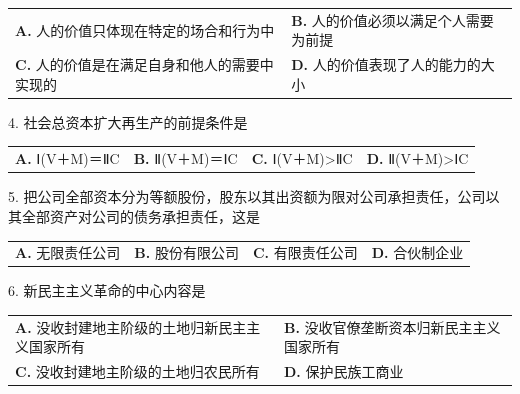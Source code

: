 \documentclass[UTF8,11pt]{ctexart}
\begin{document}
\begin{center}\begin{tabular}{>{\raggedright\arraybackslash}p{\dimexpr(\linewidth-4\tabcolsep)/2\relax}>{\raggedright\arraybackslash}p{\dimexpr(\linewidth-4\tabcolsep)/2\relax}}
\textbf{A.} 人的价值只体现在特定的场合和行为中 & \textbf{B.} 人的价值必须以满足个人需要为前提\\[.35em]
\textbf{C.} 人的价值是在满足自身和他人的需要中实现的 & \textbf{D.} 人的价值表现了人的能力的大小\\[.35em]\end{tabular}\end{center}

4. 社会总资本扩大再生产的前提条件是


\begin{center}\begin{tabular}{>{\raggedright\arraybackslash}p{\dimexpr(\linewidth-8\tabcolsep)/4\relax}>{\raggedright\arraybackslash}p{\dimexpr(\linewidth-8\tabcolsep)/4\relax}>{\raggedright\arraybackslash}p{\dimexpr(\linewidth-8\tabcolsep)/4\relax}>{\raggedright\arraybackslash}p{\dimexpr(\linewidth-8\tabcolsep)/4\relax}}
\textbf{A.} Ⅰ(V＋M)＝ⅡC & \textbf{B.} Ⅱ(V＋M)＝ⅠC & \textbf{C.} Ⅰ(V＋M)>ⅡC & \textbf{D.} Ⅱ(V＋M)>ⅠC\\[.35em]\end{tabular}\end{center}

5. 把公司全部资本分为等额股份，股东以其出资额为限对公司承担责任，公司以其全部资产对公司的债务承担责任，这是


\begin{center}\begin{tabular}{>{\raggedright\arraybackslash}p{\dimexpr(\linewidth-8\tabcolsep)/4\relax}>{\raggedright\arraybackslash}p{\dimexpr(\linewidth-8\tabcolsep)/4\relax}>{\raggedright\arraybackslash}p{\dimexpr(\linewidth-8\tabcolsep)/4\relax}>{\raggedright\arraybackslash}p{\dimexpr(\linewidth-8\tabcolsep)/4\relax}}
\textbf{A.} 无限责任公司 & \textbf{B.} 股份有限公司 & \textbf{C.} 有限责任公司 & \textbf{D.} 合伙制企业\\[.35em]\end{tabular}\end{center}

6. 新民主主义革命的中心内容是


\begin{center}\begin{tabular}{>{\raggedright\arraybackslash}p{\dimexpr(\linewidth-4\tabcolsep)/2\relax}>{\raggedright\arraybackslash}p{\dimexpr(\linewidth-4\tabcolsep)/2\relax}}
\textbf{A.} 没收封建地主阶级的土地归新民主主义国家所有 & \textbf{B.} 没收官僚垄断资本归新民主主义国家所有\\[.35em]
\textbf{C.} 没收封建地主阶级的土地归农民所有 & \textbf{D.} 保护民族工商业\\[.35em]\end{tabular}\end{center}
\end{document}
